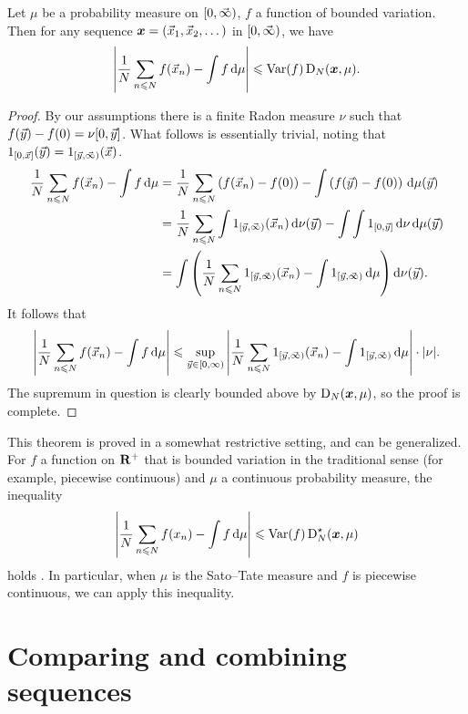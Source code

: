 \begin{theorem}
Let $\mu$ be a probability measure on $[0,\vec{\infty})$, $f$ a function of 
bounded variation. Then for any sequence ${\boldsymbol x} = (\vec{x}_1,\vec{x}_2,\dots)$ in 
$[0,\vec{\infty})$, we have 
\[
	\left| \frac{1}{N} \sum_{n\leqslant N} f(\vec{x}_n) - \int f\, \mathrm{d}\mu \right| \leqslant \operatorname{Var}(f) \operatorname{D}_N({\boldsymbol x},\mu) .
\]
\end{theorem}
\begin{proof}
By our assumptions there is a finite Radon measure $\nu$ such that 
$f(\vec{y}) - f(0) = \nu[0,\vec{y}]$. What follows is essentially trivial, noting that 
$1_{[0,\vec{x}]}(\vec{y}) = 1_{[\vec{y},\vec{\infty})}(\vec{x})$. 
\begin{align*}
	\frac{1}{N} \sum_{n\leqslant N} f(\vec{x}_n) - \int f\, \mathrm{d}\mu 
		&= \frac{1}{N} \sum_{n\leqslant N} \left(f(\vec{x}_n) - f(0)\right) - \int \left(f(\vec{y}) - f(0)\right)\, \mathrm{d}\mu(\vec{y}) \\
		&= \frac{1}{N} \sum_{n\leqslant N} \int 1_{[\vec{y},\vec{\infty})}(\vec{x}_n)\, \mathrm{d} \nu(\vec{y}) - \int \int 1_{[0,\vec{y}]}\, \mathrm{d}\nu \, \mathrm{d}\mu(\vec{y}) \\
		&= \int \left(\frac{1}{N} \sum_{n\leqslant N} 1_{[\vec{y},\vec{\infty})}(\vec{x}_n) - \int 1_{[\vec{y},\vec{\infty})}\, \mathrm{d}\mu \right) \mathrm{d}\nu(\vec{y}) .
\end{align*}
It follows that 
\[
	\left| \frac{1}{N} \sum_{n\leqslant N} f(\vec{x}_n) - \int f\, \mathrm{d}\mu \right|
		\leqslant \sup_{\vec{y}\in [0,\infty)} \left| \frac{1}{N} \sum_{n\leqslant N} 1_{[\vec{y},\vec{\infty})}(\vec{x}_n) - \int 1_{[\vec{y},\vec{\infty})}\, \mathrm{d}\mu\right| \cdot |\nu| .
\]
The supremum in question is clearly bounded above by $\operatorname{D}_N({\boldsymbol x},\mu)$, so the 
proof is complete. 
\end{proof}

This theorem is proved in a somewhat restrictive setting, and can be 
generalized. For $f$ a function on $\mathbf{R}^+$ that is bounded variation in 
the traditional sense (for example, piecewise continuous) and $\mu$ a 
continuous probability measure, the inequality 
\[
	\left| \frac{1}{N} \sum_{n\leqslant N} f(x_n) - \int f\, \mathrm{d}\mu\right| \leqslant \operatorname{Var}(f) \operatorname{D}_N^\star({\boldsymbol x},\mu) 
\]
holds \cite[Ch.~2, Th.~5.1]{kuipers-niederreiter-1974}. In particular, when 
$\mu$ is the Sato--Tate measure and $f$ is piecewise continuous, we can apply 
this inequality. 





\section{Comparing and combining sequences}

